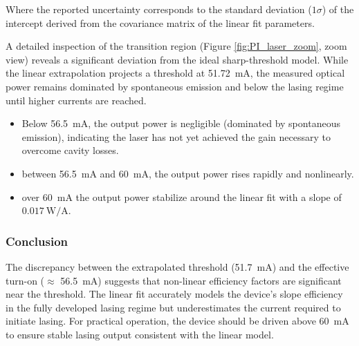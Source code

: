 Where the reported uncertainty corresponds to the standard deviation ($1\sigma$) of the intercept derived from the covariance matrix of the linear fit parameters.

A detailed inspection of the transition region (Figure \ref{fig:PI_laser_zoom}, zoom view) reveals a significant deviation from the ideal sharp-threshold model. While the linear extrapolation projects a threshold at \SI{51.72}{\milli\ampere}, the measured optical power remains dominated by spontaneous emission and below the lasing regime until higher currents are reached.

\begin{itemize}
    \item Below \SI{56.5}{\milli\ampere}, the output power is negligible (dominated by spontaneous emission), indicating the laser has not yet achieved the gain necessary to overcome cavity losses.

    \item between \SI{56.5}{\milli\ampere} and \SI{60}{\milli\ampere}, the output power rises rapidly and nonlinearly.

    \item over \SI{60}{\milli\ampere} the output power stabilize around the linear fit with a slope of $\SI{0.017}{\watt/\ampere}$.

\end{itemize}

\subsubsection*{Conclusion}

The discrepancy between the extrapolated threshold (\SI{51.7}{\milli\ampere}) and the effective turn-on ($\approx$ \SI{56.5}{\milli\ampere}) suggests that non-linear efficiency factors are significant near the threshold. The linear fit accurately models the device's slope efficiency in the fully developed lasing regime but underestimates the current required to initiate lasing. For practical operation, the device should be driven above \SI{60}{\milli\ampere} to ensure stable lasing output consistent with the linear model.